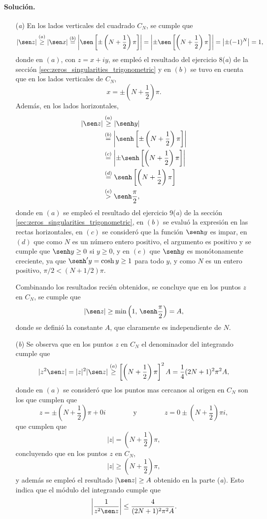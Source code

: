 \documentclass[a4paper]{report}
\begin{document}
\paragraph{Solución.} 
\begin{enumerate}
 \item[(\textit{a})] En los lados verticales del cuadrado \(C_N\), se cumple que 
 \[
  |\sen z|\overset{(a)}{\geq}|\sen x|\overset{(b)}{=}\left|\sen\left[\pm\left(N+\frac{1}{2}\right)\pi\right]\right|=\left|\pm\sen\left[\left(N+\frac{1}{2}\right)\pi\right]\right|=\left|\pm(-1)^N\right|=1,
 \]
 donde en \((a)\), con \(z=x+iy\), se empleó el resultado del ejercicio 8(\textit{a}) de la sección \ref{sec:zeros_singularities_trigonometric} y en \((b)\) se tuvo en cuenta que en los lados verticales de \(C_N\),
 \[
  x=\pm\left(N+\frac{1}{2}\right)\pi.
 \]
 Además, en los lados horizontales,
 \begin{align*}
  |\sen z|&\overset{(a)}{\geq}|\senh y|\\
   &\overset{(b)}{=}\left|\senh\left[\pm\left(N+\frac{1}{2}\right)\pi\right]\right|\\
   &\overset{(c)}{=}\left|\pm\senh\left[\left(N+\frac{1}{2}\right)\pi\right]\right|\\
   &\overset{(d)}{=}\senh\left[\left(N+\frac{1}{2}\right)\pi\right]\\
   &\overset{(e)}{>}\senh\frac{\pi}{2},
 \end{align*}
 donde en \((a)\) se empleó el resultado del ejercicio 9(\textit{a}) de la sección \ref{sec:zeros_singularities_trigonometric}, en \((b)\) se evaluó la expresión en las rectas horizontales, en \((c)\) se consideró que la función \(\senh y\) es impar, en \((d)\) que como \(N\) es un número entero positivo, el argumento es positivo y se cumple que \(\senh y\geq0\) si \(y\geq0\), y en \((e)\) que \(\senh y\) es monótonamente creciente, ya que \(\senh'y=\cosh y\geq1\) para todo \(y\), y como \(N\) es un entero positivo, \(\pi/2<(N+1/2)\pi\). 
 
 Combinando los resultados recién obtenidos, se concluye que en los puntos \(z\) en \(C_N\), se cumple que 
 \[
  |\sen z|\geq\min\left(1,\,\senh\frac{\pi}{2}\right)=A,
 \]
 donde se definió la constante \(A\), que claramente es independiente de \(N\).
 \item[(\textit{b})] Se observa que en los puntos \(z\) en \(C_N\) el denominador del integrando cumple que 
 \[
  |z^2\sen z|=|z|^2|\sen z|\overset{(a)}{\geq}\left[\left(N+\frac{1}{2}\right)\pi\right]^2A=\frac{1}{4}(2N+1)^2\pi^2A,
 \]
 donde en \((a)\) se consideró que los puntos mas cercanos al origen en \(C_N\) son los que cumplen que 
 \[
  z=\pm\left(N+\frac{1}{2}\right)\pi+0i
  \qquad\qquad\textrm{y}\qquad\qquad
  z=0\pm\left(N+\frac{1}{2}\right)\pi i,
 \]
 que cumplen que 
 \[
  |z|=\left(N+\frac{1}{2}\right)\pi,
 \]
 concluyendo que en los puntos \(z\) en \(C_N\),
 \[
  |z|\geq\left(N+\frac{1}{2}\right)\pi,
 \]
 y además se empleó el resultado \(|\sen z|\geq A\) obtenido en la parte (\textit{a}). Esto indica que el módulo del integrando cumple que 
 \[
  \left|\frac{1}{z^2\sen z}\right|\leq\frac{4}{(2N+1)^2\pi^2A}.
 \]


\end{enumerate}
\end{document}
